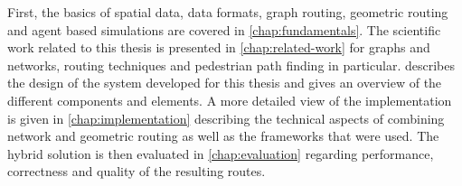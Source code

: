 	First, the basics of spatial data, data formats, graph routing, geometric routing and agent based simulations are covered in \cref{chap:fundamentals}.
	The scientific work related to this thesis is presented in \cref{chap:related-work} for graphs and networks, routing techniques and pedestrian path finding in particular.
	 describes the design of the system developed for this thesis and gives an overview of the different components and elements.
	A more detailed view of the implementation is given in \cref{chap:implementation} describing the technical aspects of combining network and geometric routing as well as the frameworks that were used.
	The hybrid solution is then evaluated in \cref{chap:evaluation} regarding performance, correctness and quality of the resulting routes.
	
